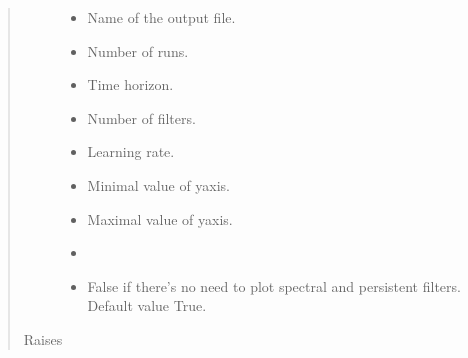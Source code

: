 \documentclass[letterpaper,10pt,english]{sphinxmanual}
\begin{document}
\begin{fulllineitems}
\begin{quote}
\begin{description}
\begin{itemize}
\item {} 
\sphinxAtStartPar
{} \textendash{} Name of the output file.

\item {} 
\sphinxAtStartPar
{} \textendash{} Number of runs.

\item {} 
\sphinxAtStartPar
{} \textendash{} Time horizon.

\item {} 
\sphinxAtStartPar
{} \textendash{} Number of filters.

\item {} 
\sphinxAtStartPar
{} \textendash{} Learning rate.

\item {} 
\sphinxAtStartPar
{} \textendash{} Minimal value of y\sphinxhyphen{}axis.

\item {} 
\sphinxAtStartPar
{} \textendash{} Maximal value of y\sphinxhyphen{}axis.

\item {} 
\sphinxAtStartPar
{} \textendash{} 

\item {} 
\sphinxAtStartPar
{} \textendash{} False if there’s no need to plot spectral and persistent filters.
Default value \sphinxhyphen{} True.

\end{itemize}

\item[{Raises}] \leavevmode
\sphinxAtStartPar
{} \textendash{} 

\end{description}\end{quote}

\end{fulllineitems}

\end{document}
